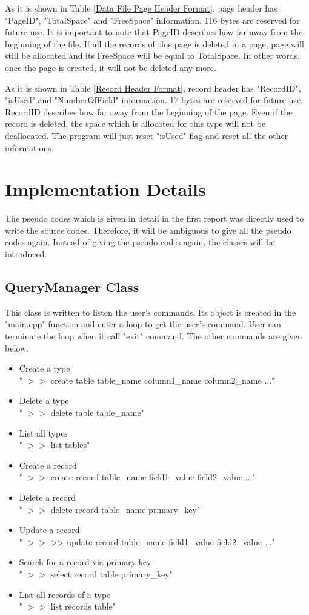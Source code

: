 \documentclass[12pt]{article}
\begin{document}
As it is shown in Table \ref{Data File Page Header Format}, page header has "PageID", "TotalSpace" and "FreeSpace" information. 116 bytes are reserved for future use. It is important to note that PageID describes how far away from the beginning of the file. If all the records of this page is deleted in a page, page will still be allocated and its FreeSpace will be equal to TotalSpace. In other words, once the page is created, it will not be deleted any more.

As it is shown in Table \ref{Record Header Format}, record header has "RecordID", "isUsed" and "NumberOfField" information. 17 bytes are reserved for future use. RecordID describes how far away from the beginning of the page. Even if the record is deleted, the space which is allocated for this type will not be deallocated. The program will just reset "isUsed" flag and reset all the other informations.

\section{Implementation Details}
The pseudo codes which is given in detail in the first report was directly used to write the source codes. Therefore, it will be ambiguous to give all the pseudo codes again. Instead of giving the pseudo codes again, the classes will be introduced.

\subsection{QueryManager Class}
This class is written to listen the user's commands. Its object is created in the "main.cpp" function and enter a loop to get the user's command. User can terminate the loop when it call "exit" command. The other commands are given below.

\begin{itemize}
\item Create a type \\
" $>>$ create table table\_name column1\_name column2\_name ..."
\item Delete a type \\
" $>>$ delete table table\_name"
\item List all types \\
" $>>$ list tables"
\item Create a record \\
" $>>$ create record table\_name field1\_value field2\_value ..."
\item Delete a record \\
" $>>$ delete record table\_name primary\_key"
\item Update a record \\
" $>>$ >> update record table\_name field1\_value field2\_value ..."
\item Search for a record via primary key \\
" $>>$ select record table primary\_key"
\item List all records of a type \\
" $>>$ list records table"
\end{itemize}
\end{document}
